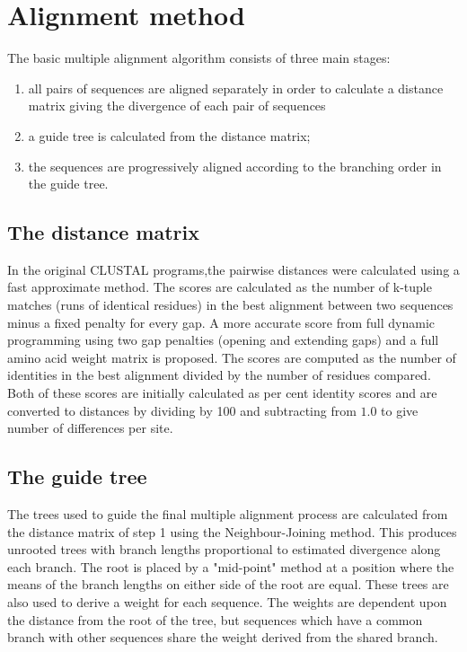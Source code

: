 \section{Alignment method}
The basic multiple alignment algorithm consists of three main stages: 
\begin{enumerate}
\item all pairs of sequences are aligned separately in order to calculate a distance matrix giving the divergence of each pair of sequences
\item a guide tree is calculated  from the distance matrix;
\item the sequences are progressively aligned according to the branching order in the guide tree. 
\end{enumerate}

\subsection{The distance matrix}
In the original CLUSTAL programs,the pairwise distances were calculated using a fast approximate method.
The scores are calculated as the number of k-tuple matches (runs of identical residues) in the best alignment between two sequences minus a fixed penalty for every gap. 
A more accurate score from full dynamic programming using two gap penalties (opening and extending gaps) and a full amino acid weight matrix is proposed.
The scores are computed as the number of identities in the best alignment divided by the number of residues compared.  
Both of these scores are initially calculated as per cent identity scores and are converted to distances by dividing by 100 and subtracting from $1.0$ to give number of differences per site.

\subsection{The guide tree}
The trees used to guide the final multiple alignment process are calculated from the distance matrix of step 1 using the Neighbour-Joining method.  This produces unrooted trees with branch lengths proportional to estimated divergence along each branch. The root is placed by a "mid-point" method at a position where the means of the branch lengths on either side of the root are equal. These trees are  also used to derive a weight for each sequence.  The weights are dependent upon the distance from the  root of  the tree, but sequences which have a common branch with other sequences share the weight derived from the shared branch.

